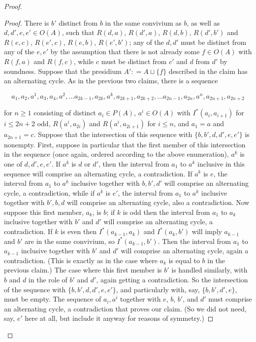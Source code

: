 \documentclass[10pt,a4paper]{amsart}
\begin{document}
\begin{proof}
\begin{proof}
    There is $b'$ distinct from $b$ in the same convivium as $b$, as well as $d, d', e, e' \in O(A)$, such that $R(d, a)$, $R(d', a)$, $R(d, b)$, $R(d', b')$ and $R(e, c)$, $R(e', c)$, $R(e, b)$, $R(e', b')$; any of the $d, d'$ must be distinct from any of the $e, e'$ by the assumption that  there is not already some $f\in O(A)$ with $R(f, a)$ and $R(f, c)$, while $c$ must be distinct from $c'$ and $d$ from $d'$ by soundness. Suppose that the presidium $A' : = A \sqcup \{f\}$ described in the claim has an alternating cycle. As  in the previous two claims, there is a sequence 

  $$a_1, a_2, a^{1}, a_{3}, a_{4}, a^{2}, \ldots a_{2k-1}, a_{2k}, a^{k}, a_{2k+1}, a_{2k+2}, \ldots a_{2n-1}, a_{2n}, a^{n}, a_{2n+1}, a_{2n+2} $$

for $n \geq 1$ consisting of distinct $a_i \in P(A)$, $a^i \in O(A)$ with $I^{*}(a_i, a_{i+1})$ for $i \leq 2n+2$ odd, $R(a^i, a_{2i})$ and $R(a^i, a_{2i+1})$ for $i \leq n$,  and $a_1 = a$ and $a_{2n+1} = c$. Suppose that the intersection of this sequence with $\{b, b', d, d', e, e'\}$ is nonempty. First, suppose in particular that the first member of this intersection in the sequence (once again, ordered according to the above enumeration), $a^{k}$ is one of $d, d', e, e'$. If $a^{k} $ is $d$ or $d'$, then the interval from $a_1$ to $a^k$ inclusive in this sequence will comprise an alternating cycle, a contradiction. If $a^{k}$ is $e$, the interval from $a_1$ to $a^k$ inclusive together with $b, b', d'$ will comprise an alternating cycle, a contradiction, while if $a^{k}$ is $e'$, the interval from $a_1$ to $a^k$ inclusive together with $b', b, d$ will comprise an alternating cycle, also a contradiction. Now suppose this first member, $a_k$, is $b$; if $k$ is odd then the interval from $a_1$ to $a_k$ inclusive together with $b'$ and $d'$ will comprise an alternating cycle, a contradiction. If $k$ is even then $I^{*}(a_{k-1}, a_{k})$ and $I^{*}(a_{k}, b')$ will imply $a_{k-1}$ and $b'$ are in the same convivium, so $I^{*}(a_{k-1}, b')$. Then the interval from $a_1$ to $a_{k-1}$ inclusive together with $b'$ and  $d'$ will comprise an alternating cycle, again a contradiction. (This is exactly as in the case where $a_{k}$ is equal to $b$ in the previous claim.) The case where this first member is $b'$ is handled similarly, with $b$ and $d$ in the role of $b'$ and $d'$, again getting a contradiction. So the intersection of the sequence with $\{b, b', d, d', e, e'\}$, and particularly with, say, $\{b, b', d', e\}$, must be empty. The sequence of $a_i, a^i$ together with $e$, $b$, $b'$, and $d'$ must comprise an alternating cycle, a contradiction that proves our claim. (So we did not need, say, $e'$ here at all, but include it anyway for reasons of symmetry.)
\end{proof}


\end{proof}
\end{document}
